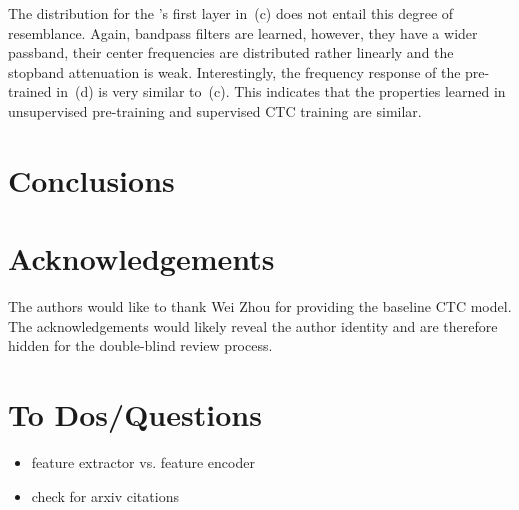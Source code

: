 \documentclass{INTERSPEECH2023}
\begin{document}
The distribution for the \wvtwo \fe's first layer in \,(c) does not entail this degree of resemblance.
Again, bandpass filters are learned, however, they have a wider passband, their center frequencies are distributed rather linearly and the stopband attenuation is weak.
Interestingly, the frequency response of the pre-trained \wvtwo \fe in \,(d) is very similar to \,(c).
This indicates that the properties learned in unsupervised pre-training and supervised \gls{CTC} training are similar.

\section{Conclusions}

\section{Acknowledgements}

\ifinterspeechfinal
     The authors would like to thank Wei Zhou for providing the baseline \gls{CTC} model.
\else
     The acknowledgements would likely reveal the author identity and are therefore hidden for the double-blind review process.
\fi

{
\color{red}
\section{To Dos/Questions}
\begin{itemize}
  \item \wvtwo feature extractor vs. feature encoder
  \item check for arxiv citations
\end{itemize}
}



\end{document}
